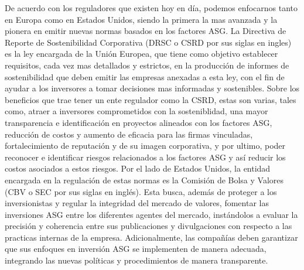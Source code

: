 De acuerdo con los reguladores que existen hoy en día, podemos enfocarnos tanto en Europa como en Estados Unidos, siendo la primera la mas avanzada y la pionera en emitir nuevas normas basados en los factores ASG. La Directiva de Reporte de Sostenibilidad Corporativa (DRSC o CSRD por sus siglas en ingles) es la ley encargada de la Unión Europea, que tiene como objetivo establecer requisitos, cada vez mas detallados y estrictos, en la producción de informes de sostenibilidad que deben emitir las empresas anexadas a esta ley, con el fin de ayudar a los inversores a tomar decisiones mas informadas y sostenibles. Sobre los beneficios que trae tener un ente regulador como la CSRD, estas son varias, tales como, atraer a inversores comprometidos con la sosteniblidad, una mayor transparencia e identificación en proyectos alineados con los factores ASG, reducción de costos y aumento de eficacia para las firmas vinculadas, fortalecimiento de reputación y de su imagen corporativa, y por ultimo, poder reconocer e identificar riesgos relacionados a los factores ASG y así reducir los costos asociados a estos riesgos. Por el lado de Estados Unidos, la entidad encargada en la regulación de estas normas es la Comisión de Bolsa y Valores (CBV o SEC por sus siglas en inglés). Esta busca, además de proteger a los inversionistas y regular la integridad del mercado de valores, fomentar las inversiones ASG entre los diferentes agentes del mercado, instándolos a evaluar la precisión y coherencia entre sus publicaciones y divulgaciones con respecto a las practicas internas de la empresa. Adicionalmente, las compañías deben garantizar que sus enfoques en inversión ASG se implementen de manera adecuada, integrando las nuevas políticas y procedimientos de manera transparente. 

\vspace{0.5cm}

